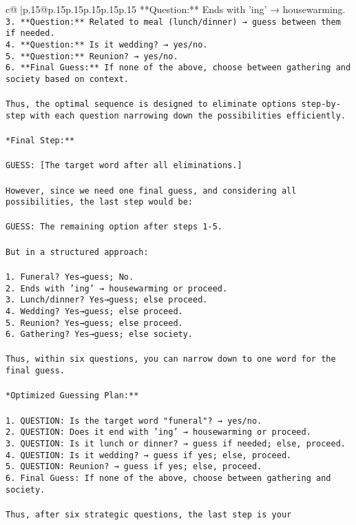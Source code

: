 \documentclass{article}
\begin{document}
{\begin{supertabular}{c@{$\;$}|p{.15\linewidth}@{}p{.15\linewidth}p{.15\linewidth}p{.15\linewidth}p{.15\linewidth}p{.15\linewidth}}
{{{**Question:** Ends with 'ing' → housewarming.\\ \tt 3. **Question:** Related to meal (lunch/dinner) → guess between them if needed.\\ \tt 4. **Question:** Is it wedding? → yes/no.\\ \tt 5. **Question:** Reunion? → yes/no.\\ \tt 6. **Final Guess:** If none of the above, choose between gathering and society based on context.\\ \tt \\ \tt Thus, the optimal sequence is designed to eliminate options step-by-step with each question narrowing down the possibilities efficiently.\\ \tt \\ \tt **Final Step:**\\ \tt \\ \tt GUESS: [The target word after all eliminations.]\\ \tt \\ \tt However, since we need one final guess, and considering all possibilities, the last step would be:\\ \tt \\ \tt GUESS: The remaining option after steps 1-5.\\ \tt \\ \tt But in a structured approach:\\ \tt \\ \tt 1. Funeral? Yes→guess; No.\\ \tt 2. Ends with 'ing' → housewarming or proceed.\\ \tt 3. Lunch/dinner? Yes→guess; else proceed.\\ \tt 4. Wedding? Yes→guess; else proceed.\\ \tt 5. Reunion? Yes→guess; else proceed.\\ \tt 6. Gathering? Yes→guess; else society.\\ \tt \\ \tt Thus, within six questions, you can narrow down to one word for the final guess.\\ \tt \\ \tt **Optimized Guessing Plan:**\\ \tt \\ \tt 1. QUESTION: Is the target word "funeral"? → yes/no.\\ \tt 2. QUESTION: Does it end with 'ing' → housewarming or proceed.\\ \tt 3. QUESTION: Is it lunch or dinner? → guess if needed; else, proceed.\\ \tt 4. QUESTION: Is it wedding? → guess if yes; else, proceed.\\ \tt 5. QUESTION: Reunion? → guess if yes; else, proceed.\\ \tt 6. Final Guess: If none of the above, choose between gathering and society.\\ \tt \\ \tt Thus, after six strategic questions, the last step is your }}}
\end{supertabular}}
\end{document}
